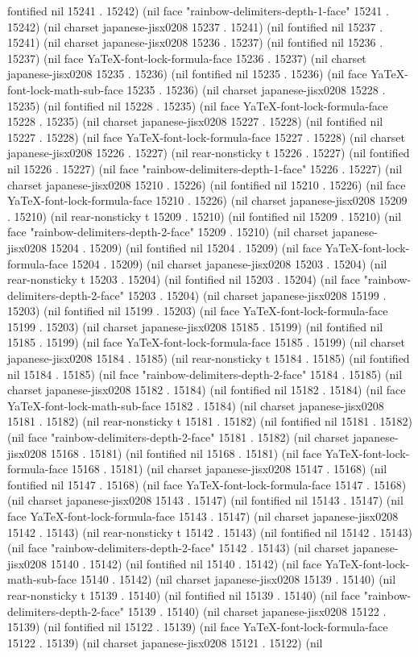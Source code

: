 fontified nil 15241 . 15242) (nil face "rainbow-delimiters-depth-1-face" 15241 . 15242) (nil charset japanese-jisx0208 15237 . 15241) (nil fontified nil 15237 . 15241) (nil charset japanese-jisx0208 15236 . 15237) (nil fontified nil 15236 . 15237) (nil face YaTeX-font-lock-formula-face 15236 . 15237) (nil charset japanese-jisx0208 15235 . 15236) (nil fontified nil 15235 . 15236) (nil face YaTeX-font-lock-math-sub-face 15235 . 15236) (nil charset japanese-jisx0208 15228 . 15235) (nil fontified nil 15228 . 15235) (nil face YaTeX-font-lock-formula-face 15228 . 15235) (nil charset japanese-jisx0208 15227 . 15228) (nil fontified nil 15227 . 15228) (nil face YaTeX-font-lock-formula-face 15227 . 15228) (nil charset japanese-jisx0208 15226 . 15227) (nil rear-nonsticky t 15226 . 15227) (nil fontified nil 15226 . 15227) (nil face "rainbow-delimiters-depth-1-face" 15226 . 15227) (nil charset japanese-jisx0208 15210 . 15226) (nil fontified nil 15210 . 15226) (nil face YaTeX-font-lock-formula-face 15210 . 15226) (nil charset japanese-jisx0208 15209 . 15210) (nil rear-nonsticky t 15209 . 15210) (nil fontified nil 15209 . 15210) (nil face "rainbow-delimiters-depth-2-face" 15209 . 15210) (nil charset japanese-jisx0208 15204 . 15209) (nil fontified nil 15204 . 15209) (nil face YaTeX-font-lock-formula-face 15204 . 15209) (nil charset japanese-jisx0208 15203 . 15204) (nil rear-nonsticky t 15203 . 15204) (nil fontified nil 15203 . 15204) (nil face "rainbow-delimiters-depth-2-face" 15203 . 15204) (nil charset japanese-jisx0208 15199 . 15203) (nil fontified nil 15199 . 15203) (nil face YaTeX-font-lock-formula-face 15199 . 15203) (nil charset japanese-jisx0208 15185 . 15199) (nil fontified nil 15185 . 15199) (nil face YaTeX-font-lock-formula-face 15185 . 15199) (nil charset japanese-jisx0208 15184 . 15185) (nil rear-nonsticky t 15184 . 15185) (nil fontified nil 15184 . 15185) (nil face "rainbow-delimiters-depth-2-face" 15184 . 15185) (nil charset japanese-jisx0208 15182 . 15184) (nil fontified nil 15182 . 15184) (nil face YaTeX-font-lock-math-sub-face 15182 . 15184) (nil charset japanese-jisx0208 15181 . 15182) (nil rear-nonsticky t 15181 . 15182) (nil fontified nil 15181 . 15182) (nil face "rainbow-delimiters-depth-2-face" 15181 . 15182) (nil charset japanese-jisx0208 15168 . 15181) (nil fontified nil 15168 . 15181) (nil face YaTeX-font-lock-formula-face 15168 . 15181) (nil charset japanese-jisx0208 15147 . 15168) (nil fontified nil 15147 . 15168) (nil face YaTeX-font-lock-formula-face 15147 . 15168) (nil charset japanese-jisx0208 15143 . 15147) (nil fontified nil 15143 . 15147) (nil face YaTeX-font-lock-formula-face 15143 . 15147) (nil charset japanese-jisx0208 15142 . 15143) (nil rear-nonsticky t 15142 . 15143) (nil fontified nil 15142 . 15143) (nil face "rainbow-delimiters-depth-2-face" 15142 . 15143) (nil charset japanese-jisx0208 15140 . 15142) (nil fontified nil 15140 . 15142) (nil face YaTeX-font-lock-math-sub-face 15140 . 15142) (nil charset japanese-jisx0208 15139 . 15140) (nil rear-nonsticky t 15139 . 15140) (nil fontified nil 15139 . 15140) (nil face "rainbow-delimiters-depth-2-face" 15139 . 15140) (nil charset japanese-jisx0208 15122 . 15139) (nil fontified nil 15122 . 15139) (nil face YaTeX-font-lock-formula-face 15122 . 15139) (nil charset japanese-jisx0208 15121 . 15122) (nil 